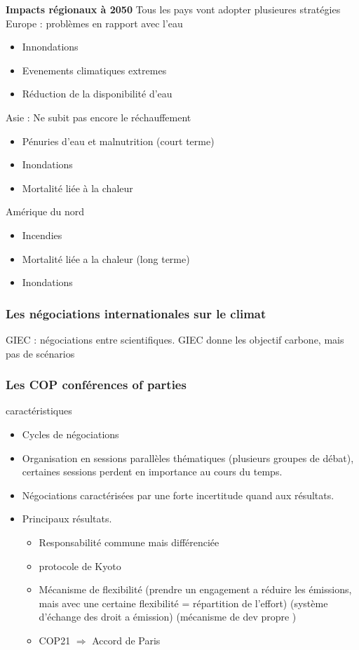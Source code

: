 \documentclass{article}
\begin{document}
\textbf{Impacts régionaux à 2050}
Tous les pays vont adopter plusieures stratégies 
Europe : problèmes en rapport avec l'eau
\begin{itemize}
	\item Innondations
	\item Evenements climatiques extremes
	\item Réduction de la disponibilité d'eau
\end{itemize}
Asie : Ne subit pas encore le réchauffement
\begin{itemize}
 \item Pénuries d'eau et malnutrition (court terme)
 \item Inondations 
 \item Mortalité liée à la chaleur
\end{itemize}
Amérique du nord
\begin{itemize}
	\item Incendies
	\item Mortalité liée a la chaleur (long terme)
	\item Inondations
\end{itemize}

\subsubsection{Les négociations internationales sur le climat}
GIEC : négociations entre scientifiques.
GIEC donne les objectif carbone, mais pas de scénarios

\subsubsection{Les COP conférences of parties}
caractéristiques 
\begin{itemize}
	\item Cycles de négociations
	\item Organisation en sessions parallèles thématiques (plusieurs groupes de débat), certaines sessions perdent en importance au cours du temps.
	\item Négociations caractérisées par une forte incertitude quand aux résultats.
	\item Principaux résultats.
	\begin{itemize}
		\item Responsabilité commune mais différenciée 
		\item protocole de Kyoto
		\item Mécanisme de flexibilité (prendre un engagement a réduire les émissions, mais avec une certaine flexibilité = répartition de l'effort) (système d'échange des droit a émission) (mécanisme de dev propre )
		\item COP21 $\Rightarrow$ Accord de Paris
	\end{itemize}
\end{itemize}
\end{document}
